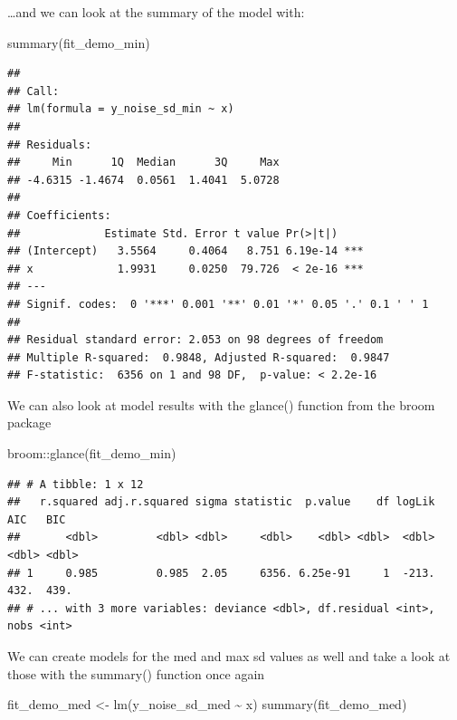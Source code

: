 \documentclass[
]{book}
\newenvironment{Shaded}{\begin{snugshade}}{\end{snugshade}}
\newcommand{\FunctionTok}[1]{\textcolor[rgb]{0.00,0.00,0.00}{#1}}
\newcommand{\NormalTok}[1]{#1}
\newcommand{\OtherTok}[1]{\textcolor[rgb]{0.56,0.35,0.01}{#1}}
\newcommand{\SpecialCharTok}[1]{\textcolor[rgb]{0.00,0.00,0.00}{#1}}
\begin{document}
\ldots and we can look at the summary of the model with:

\begin{Shaded}
\begin{Highlighting}[]
\FunctionTok{summary}\NormalTok{(fit\_demo\_min)}
\end{Highlighting}
\end{Shaded}

\begin{verbatim}
## 
## Call:
## lm(formula = y_noise_sd_min ~ x)
## 
## Residuals:
##     Min      1Q  Median      3Q     Max 
## -4.6315 -1.4674  0.0561  1.4041  5.0728 
## 
## Coefficients:
##             Estimate Std. Error t value Pr(>|t|)    
## (Intercept)   3.5564     0.4064   8.751 6.19e-14 ***
## x             1.9931     0.0250  79.726  < 2e-16 ***
## ---
## Signif. codes:  0 '***' 0.001 '**' 0.01 '*' 0.05 '.' 0.1 ' ' 1
## 
## Residual standard error: 2.053 on 98 degrees of freedom
## Multiple R-squared:  0.9848, Adjusted R-squared:  0.9847 
## F-statistic:  6356 on 1 and 98 DF,  p-value: < 2.2e-16
\end{verbatim}

We can also look at model results with the glance() function from the broom package

\begin{Shaded}
\begin{Highlighting}[]
\NormalTok{broom}\SpecialCharTok{::}\FunctionTok{glance}\NormalTok{(fit\_demo\_min)}
\end{Highlighting}
\end{Shaded}

\begin{verbatim}
## # A tibble: 1 x 12
##   r.squared adj.r.squared sigma statistic  p.value    df logLik   AIC   BIC
##       <dbl>         <dbl> <dbl>     <dbl>    <dbl> <dbl>  <dbl> <dbl> <dbl>
## 1     0.985         0.985  2.05     6356. 6.25e-91     1  -213.  432.  439.
## # ... with 3 more variables: deviance <dbl>, df.residual <int>, nobs <int>
\end{verbatim}

We can create models for the med and max sd values as well and take a look at those with the summary() function once again

\begin{Shaded}
\begin{Highlighting}[]
\NormalTok{fit\_demo\_med }\OtherTok{\textless{}{-}} \FunctionTok{lm}\NormalTok{(y\_noise\_sd\_med }\SpecialCharTok{\textasciitilde{}}\NormalTok{ x)}
\FunctionTok{summary}\NormalTok{(fit\_demo\_med)}
\end{Highlighting}
\end{Shaded}
\end{document}
